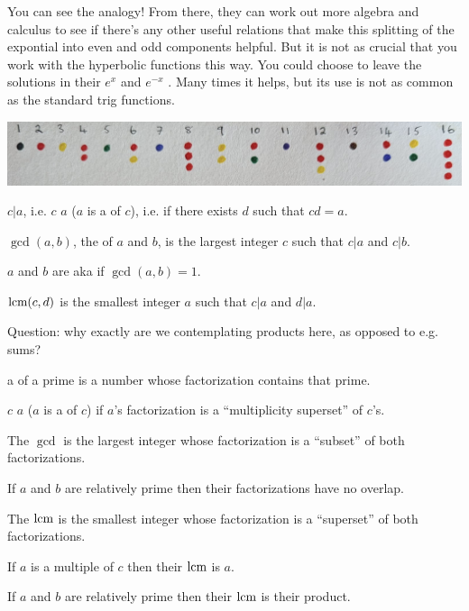 You can see the analogy! From there, they can work out more algebra and calculus to see if there's
any other useful relations that make this splitting of the expontial into even and odd components
helpful. But it is not as crucial that you work with the hyperbolic functions this way. You could
choose to leave the solutions in their $e^{x}$ and $e^{-x}$ . Many times it helps, but its use is
not as common as the standard trig functions.



\begin{definition*}


  \begin{mdframed}
    \includegraphics[width=400pt]{img/foundations--integers-e251.png}
  \end{mdframed}

 $c | a$, i.e. $c$  $a$ ($a$ is a  of $c$), i.e. if there exists $d$ such that $cd = a$.

 $\gcd(a, b)$, the  of $a$ and $b$, is the largest integer $c$ such that $c | a$ and $c | b$.

  $a$ and $b$ are  aka  if $\gcd(a, b) = 1$.

  $\text{lcm}(c, d)$ is the smallest integer $a$ such that $c|a$ and $d|a$.
\end{definition*}

  Question: why exactly are we contemplating products here, as opposed to e.g. sums?




\begin{remark*}
  a  of a prime is a number whose factorization contains that prime.

  $c$  $a$ ($a$ is a  of $c$) if $a$'s factorization is a ``multiplicity superset​'' of $c$'s.

  The $\gcd$ is the largest integer whose factorization is a ``subset​'' of both factorizations.

  If $a$ and $b$ are relatively prime then their factorizations have no overlap.

  The $\text{lcm}$ is the smallest integer whose factorization is a ``superset​'' of both factorizations.

  If $a$ is a multiple of $c$ then their $\text{lcm}$ is $a$.

  If $a$ and $b$ are relatively prime then their $\text{lcm}$ is their product.
\end{remark*}

